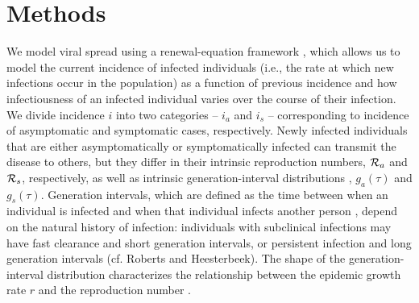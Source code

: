 \documentclass[12pt]{article}
\begin{document}
\section{Methods}

We model viral spread using a renewal-equation framework \cite{heesterbeek1996concept}, which allows us to model the current incidence of infected individuals (i.e., the rate at which new infections occur in the population) as a function of previous incidence and how infectiousness of an infected individual varies over the course of their infection.
We divide incidence $i$ into two categories -- $i_a$ and $i_s$ -- corresponding to incidence of asymptomatic and symptomatic cases, respectively.
Newly infected individuals that are either asymptomatically or symptomatically infected can transmit the disease to others, but they differ in their intrinsic reproduction numbers, ${\cal{R}}_a$ and ${\cal{R}}_s$, respectively, as well as intrinsic generation-interval distributions \cite{champredon2015intrinsic}, $g_a(\tau)$ and $g_s(\tau)$.
Generation intervals, which are defined as the time between when an individual is infected and when that individual infects another person \cite{svensson2007note}, depend on the natural history of infection:
individuals with subclinical infections may have fast clearance and short generation intervals, or persistent infection and long generation intervals (cf. Roberts and Heesterbeek\cite{roberts2007model}).
The shape of the generation-interval distribution characterizes the relationship between the epidemic growth rate $r$ and the reproduction number \cite{wallinga2007generation}.
\end{document}
